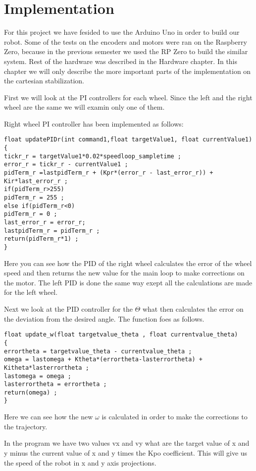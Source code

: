 \chapter{Implementation} \label{ch:implementation}

For this project we have fesided to use the Arduino Uno in order to build our robot. Some of the tests on the encoders and motors were ran on the Raspberry Zero, because in the previous semester we used the RP Zero to build the similar system. Rest of the hardware was described in the Hardware chapter. In this chapter we will only describe the more important parts of the implementation on the cartesian stabilization. 

First we will look at the PI controllers for each wheel. Since the left and the right wheel are the same we will examin only one of them.

Right wheel PI controller has been implemented as follows:
\begin{lstlisting}
float updatePIDr(int command1,float targetValue1, float currentValue1) {
tickr_r = targetValue1*0.02*speedloop_sampletime ;
error_r = tickr_r - currentValue1 ;
pidTerm_r =lastpidTerm_r + (Kpr*(error_r - last_error_r)) +
Kir*last_error_r ;
if(pidTerm_r>255)
pidTerm_r = 255 ;
else if(pidTerm_r<0)
pidTerm_r = 0 ;
last_error_r = error_r;
lastpidTerm_r = pidTerm_r ;
return(pidTerm_r*1) ;
}
\end{lstlisting}

Here you can see how the PID of the right wheel calculates the error of the wheel speed and then returns the new value for the main loop to make corrections on the motor. The left PID is done the same way exept all the calculations are made for the left wheel.

Next we look at the PID controller for the $\Theta$ what then calculates the error on the deviation from the desired angle. The function foes as follows.

\begin{lstlisting}
float update_w(float targetvalue_theta , float currentvalue_theta)
{
errortheta = targetvalue_theta - currentvalue_theta ;
omega = lastomega + Ktheta*(errortheta-lasterrortheta) +
Kitheta*lasterrortheta ;
lastomega = omega ;
lasterrortheta = errortheta ;
return(omega) ;
}
\end{lstlisting}

Here we can see how the new $\omega$ is calculated in order to make the corrections to the trajectory.

In the program we have two values vx and vy what are the target value of x and y minus the current value of x and y times the Kpo coefficient. This will give us the speed of the robot in x and y axis projections.

